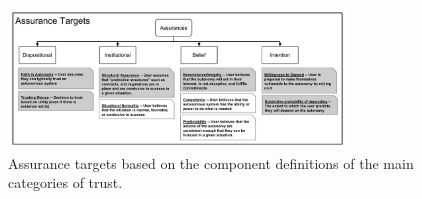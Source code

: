         \begin{figure}[htbp]
            \includegraphics[width=0.8\textwidth]{Figures/Assurances.pdf}%
            \caption{Assurance targets based on the component definitions of the main categories of trust.} %
            \label{fig:Assurance_classes}
        \end{figure}
